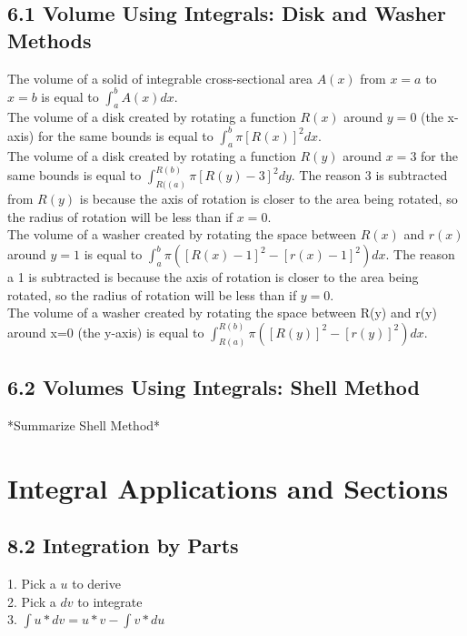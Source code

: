 \documentclass{article}
\begin{document}
        \subsection*{6.1 Volume Using Integrals: Disk and Washer Methods}
            The volume of a solid of integrable cross-sectional area $A(x)$ from $x=a$ to $x=b$ is equal to $\int_{a}^{b} A(x)dx$. \\
            The volume of a disk created by rotating a function $R(x)$ around $y=0$ (the x-axis) for the same bounds is equal to $\int_{a}^{b} \pi [R(x)]^2 dx$. \\
            The volume of a disk created by rotating a function $R(y)$ around $x=3$ for the same bounds is equal to $\int_{R((a)}^{R(b)} \pi [R(y)-3]^2 dy$. The reason 3 is subtracted from $R(y)$ is because the axis of rotation is closer to the area being rotated, so the radius of rotation will be less than if $x=0$.\\
            The volume of a washer created by rotating the space between $R(x)$ and $r(x)$ around $y=1$ is equal to $\int_{a}^{b} \pi ([R(x) - 1]^2 - [r(x) - 1]^2) dx$. The reason a 1 is subtracted is because the axis of rotation is closer to the area being rotated, so the radius of rotation will be less than if $y=0$. \\
            The volume of a washer created by rotating the space between R(y) and r(y) around x=0 (the y-axis) is equal to $\int_{R(a)}^{R(b)} \pi ([R(y)]^2 - [r(y)]^2) dx$. \\
        \color{Orange}
        \subsection*{6.2 Volumes Using Integrals: Shell Method}
            *Summarize Shell Method*
        \color{Black}
    \section{Integral Applications and Sections}
        \color{Cyan} 
        \subsection*{8.2 Integration by Parts}
            1. Pick a $u$ to derive \\
            2. Pick a $dv$ to integrate \\
            3. $\int u * dv = u * v - \int v * du$ \\
        \color{Cerulean}
\end{document}
